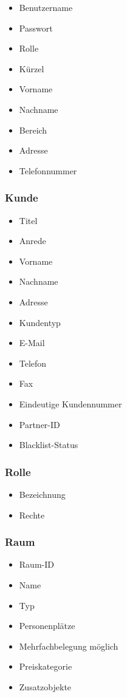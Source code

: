 \begin{itemize}
\item Benutzername
\item Passwort
\item Rolle
\item Kürzel
\item Vorname
\item Nachname
\item Bereich
\item Adresse
\item Telefonnummer
\end{itemize}

\subsubsection{Kunde}

\begin{itemize}
\item Titel
\item Anrede
\item Vorname
\item Nachname
\item Adresse
\item Kundentyp
\item E-Mail
\item Telefon
\item Fax
\item Eindeutige Kundennummer
\item Partner-ID
\item Blacklist-Status
\end{itemize}

\subsubsection{Rolle}

\begin{itemize}
\item Bezeichnung
\item Rechte
\end{itemize}

\subsubsection{Raum}

\begin{itemize}
\item Raum-ID
\item Name
\item Typ
\item Personenplätze
\item Mehrfachbelegung möglich
\item Preiskategorie
\item Zusatzobjekte
\end{itemize}

